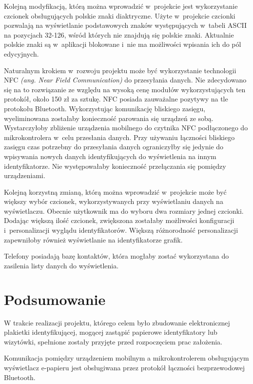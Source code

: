 \documentclass[a4paper,12pt, twoside]{article}
\begin{document}
        Kolejną modyfikacją, którą można wprowadzić w~projekcie jest wykorzystanie czcionek obsługujących polskie znaki diaktryczne. Użyte w~projekcie czcionki pozwalają na wyświetlanie podstawowych znaków występujących w~tabeli ASCII na pozycjach 32-126, wśród których nie znajdują się polskie znaki. Aktualnie polskie znaki są w~aplikacji blokowane i~nie ma możliwości wpisania ich do pól edycyjnych.
        
        Naturalnym krokiem w~rozwoju projektu może być wykorzystanie technologii NFC \textit{(ang. Near Field Communication)} do przesyłania danych. Nie zdecydowano się na to rozwiązanie ze względu na wysoką cenę modułów wykorzystujących ten protokół, około 150 zł za sztukę. NFC posiada zauważalne pozytywy na tle protokołu Bluetooth. Wykorzystując komunikację bliskiego zasięgu, wyeliminowana zostałaby konieczność parowania się urządzeń ze sobą. Wystarczyłoby zbliżenie urządzenia mobilnego do czytnika NFC podłączonego do mikrokontrolera w~celu przesłania danych. Przy używaniu łączności bliskiego zasięgu czas potrzebny do przesyłania danych ograniczyłby się jedynie do wpisywania nowych danych identyfikujących do wyświetlenia na innym identyfikatorze. Nie występowałaby konieczność przełączania się pomiędzy urządzeniami.
    	
    	Kolejną korzystną zmianą, którą można wprowadzić w~projekcie może być większy wybór czcionek, wykorzystywanych przy wyświetlaniu danych na wyświetlaczu. Obecnie użytkownik ma do wyboru dwa rozmiary jednej czcionki. Dodając większą ilość czcionek, zwiększona zostałaby możliwości konfiguracji i~personalizacji wyglądu identyfikatorów. Większą różnorodność personalizacji zapewniłoby również wyświetlanie na identyfikatorze grafik.
    	
    	Telefony posiadają bazę kontaktów, która mogłaby zostać wykorzystana do zasilenia listy danych do wyświetlenia.

        \newpage
    	\section{Podsumowanie}
    	W trakcie realizacji projektu, którego celem było zbudowanie elektronicznej plakietki identyfikującej, mogącej zastąpić papierowe identyfikatory lub wizytówki, spełnione zostały przyjęte przed rozpoczęciem prac założenia.
    	
    	Komunikacja pomiędzy urządzeniem mobilnym a mikrokontrolerem obsługującym wyświetlacz e-papieru jest obsługiwana przez protokół łączności bezprzewodowej Bluetooth.
    	
\end{document}
